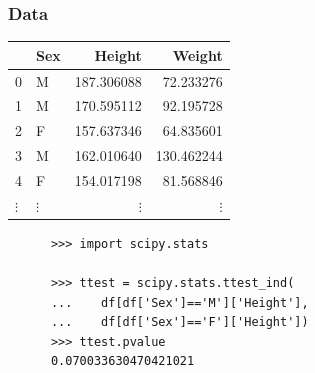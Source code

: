 \documentclass{beamer}
\begin{document}

\begin{frame}[fragile]
  \frametitle{Data}
  \begin{center}
    \begin{tabular}{llrr}
    \toprule
    & Sex & Height & Weight \\
    \midrule
    0 & M & 187.306088 & 72.233276 \\
    1 & M & 170.595112 & 92.195728 \\
    2 & F & 157.637346 & 64.835601 \\
    3 & M & 162.010640 & 130.462244 \\
    4 & F & 154.017198 & 81.568846 \\
    $\vdots$ & $\vdots$ & $\vdots$ & $\vdots$ \\
    \bottomrule
  \end{tabular}
  \pause
  \small{
    \begin{verbatim}
      >>> import scipy.stats

      >>> ttest = scipy.stats.ttest_ind(
      ...    df[df['Sex']=='M']['Height'],
      ...    df[df['Sex']=='F']['Height'])
      >>> ttest.pvalue
      0.070033630470421021
    \end{verbatim}
  }
  \end{center}
\end{frame}
\end{document}
